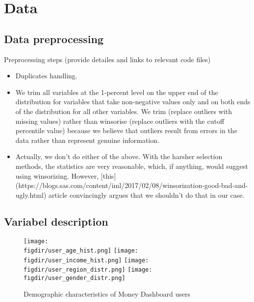 
\section{Data}%
\label{sec:data}

\subsection{Data preprocessing}%
\label{sub:data_preprocessing}

Preprocessing steps
(provide detailes and links to relevant code files)
\begin{itemize}
    \item Duplicates handling.
    \item We trim all variables at the 1-percent level on the upper end of the
        distribution for variables that take non-negative values only and on
        both ends of the distribution for all other variables. We trim
        (replace outliers with missing values) rather than winsorise (replace
        outliers with the cutoff percentile value) because we believe that
        outliers result from errors in the data rather than represent genuine
        information.

    \item Actually, we don't do either of the above. With the harsher selection
        methods, the statistics are very reasonable, which, if anything, would
        suggest using winsorizing. However,
        [this](https://blogs.sas.com/content/iml/2017/02/08/winsorization-good-bad-and-ugly.html)
        article convincingly argues that we shouldn't do that in our case.

\end{itemize}


\subsection{Variabel description}%
\label{sub:variabel_description}

\begin{figure}[H]
    \caption{Demographic characteristics of Money Dashboard users}
    \label{fig:demographics}
    \begin{center}
        \texttt{[image: \\figdir/user\_age\_hist.png]}
        \texttt{[image: \\figdir/user\_income\_hist.png]}
        \texttt{[image: \\figdir/user\_region\_distr.png]}
        \texttt{[image: \\figdir/user\_gender\_distr.png]}
    \end{center}
\end{figure}

